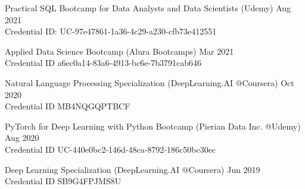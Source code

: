 Practical SQL Bootcamp for Data Analysts and Data Scientists
(Udemy) \hfill Aug 2021 \\
Credential ID: UC-97e47861-1a36-4c29-a230-cfb73e412551 \hfill
\hfill
\newline

Applied Data Science Bootcamp (Alura Bootcamps) \hfill Mar 2021 \\
Credential ID a6ec0a14-83a6-4913-bc6e-7b3791cab646
\hfill 
\newline

Natural Language Processing Specialization (DeepLearning.AI @Coursera) \hfill Oct 2020 \\
Credential ID MB4NQGQPTBCF
\hfill
\newline

PyTorch for Deep Learning with Python Bootcamp (Pierian Data Inc. @Udemy) \hfill Aug 2020 \\
Credential ID UC-440e0bc2-146d-48ca-8792-186c50bc30ec
\hfill
\newline

Deep Learning Specialization (DeepLearning.AI @Coursera) \hfill Jun 2019 \\
Credential ID SB9G4FPJMS8U